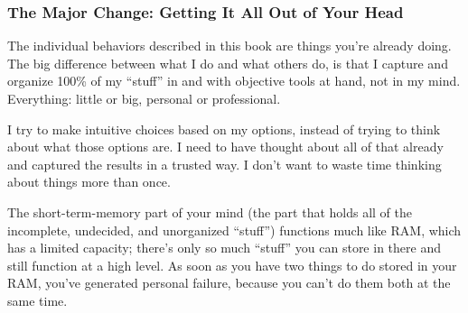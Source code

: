 \documentclass[letterpaper]{article}
\newcommand{\p}{\vspace{1em}\par}		%
\begin{document}
\subsubsection*{The Major Change: Getting It All Out of Your Head}
The individual behaviors described in this book are things you're already doing. The big difference between what I do and what others do, is that I capture and organize 100\% of my ``stuff'' in and with objective tools at hand, not in my mind. Everything: little or big, personal or professional.

\p I try to make intuitive choices based on my options, instead of trying to think about what those options are. I need to have thought about all of that already and captured the results in a trusted way. I don't want to waste time thinking about things more than once.

\p The short-term-memory part of your mind (the part that holds all of the incomplete, undecided, and unorganized ``stuff'') functions much like RAM, which has a limited capacity; there's only so much ``stuff'' you can store in there and still function at a high level. As soon as you have two things to do stored in your RAM, you've generated personal failure, because you can't do them both at the same time.
\end{document}

